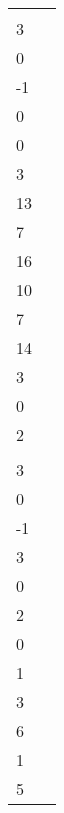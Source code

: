 \begin{activity}{10}
\begin{center}
\begin{tabular}{ll}
 &
     \(\vspan\left\{
    \begin{bmatrix}2\\3\\0\\-1\end{bmatrix},
    \begin{bmatrix}2\\0\\0\\3\end{bmatrix},
    \begin{bmatrix}3\\13\\7\\16\end{bmatrix},
    \begin{bmatrix}-1\\10\\7\\14\end{bmatrix},
    \begin{bmatrix}4\\3\\0\\2\end{bmatrix}
    \right\}
    \)
 \\
     \(\vspan\left\{
    \begin{bmatrix}2\\3\\0\\-1\end{bmatrix},
    \begin{bmatrix}4\\3\\0\\2\end{bmatrix},
    \begin{bmatrix}-3\\0\\1\\3\end{bmatrix},
    \begin{bmatrix}3\\6\\1\\5\end{bmatrix}
    \right\}
    \)


\end{tabular}
\end{center}
\end{activity}
